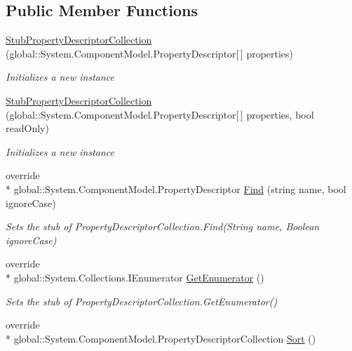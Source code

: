 \subsection*{Public Member Functions}
\begin{DoxyCompactItemize}
\item 
\hyperlink{class_system_1_1_component_model_1_1_fakes_1_1_stub_property_descriptor_collection_a564f5b7852465c1c8f40d7ab09677b2d}{Stub\-Property\-Descriptor\-Collection} (global\-::\-System.\-Component\-Model.\-Property\-Descriptor\mbox{[}$\,$\mbox{]} properties)
\begin{DoxyCompactList}\small\item\em Initializes a new instance\end{DoxyCompactList}\item 
\hyperlink{class_system_1_1_component_model_1_1_fakes_1_1_stub_property_descriptor_collection_a891e44f6ed9a8fab1f7d2bd40ed0621b}{Stub\-Property\-Descriptor\-Collection} (global\-::\-System.\-Component\-Model.\-Property\-Descriptor\mbox{[}$\,$\mbox{]} properties, bool read\-Only)
\begin{DoxyCompactList}\small\item\em Initializes a new instance\end{DoxyCompactList}\item 
override \\*
global\-::\-System.\-Component\-Model.\-Property\-Descriptor \hyperlink{class_system_1_1_component_model_1_1_fakes_1_1_stub_property_descriptor_collection_a2e0f4347638f5685ab38e98d0f2f7b63}{Find} (string name, bool ignore\-Case)
\begin{DoxyCompactList}\small\item\em Sets the stub of Property\-Descriptor\-Collection.\-Find(\-String name, Boolean ignore\-Case)\end{DoxyCompactList}\item 
override \\*
global\-::\-System.\-Collections.\-I\-Enumerator \hyperlink{class_system_1_1_component_model_1_1_fakes_1_1_stub_property_descriptor_collection_a7a800245357bfcf07aee636497a23836}{Get\-Enumerator} ()
\begin{DoxyCompactList}\small\item\em Sets the stub of Property\-Descriptor\-Collection.\-Get\-Enumerator()\end{DoxyCompactList}\item 
override \\*
global\-::\-System.\-Component\-Model.\-Property\-Descriptor\-Collection \hyperlink{class_system_1_1_component_model_1_1_fakes_1_1_stub_property_descriptor_collection_a07c1692b8b1f4b2df21bda998bfa7408}{Sort} ()

\end{DoxyCompactItemize}
